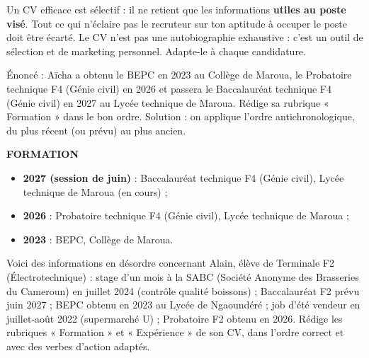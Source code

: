 \documentclass[11pt]{article}
\newcommand{\cle}[1]{{\popxbold\color{popdark}#1}}
\begin{document}
\begin{propriete}
Un CV efficace est \cle{sélectif} : il ne retient que les informations \textbf{utiles au poste visé}. Tout ce qui n'éclaire pas le recruteur sur ton aptitude à occuper le poste doit être écarté. Le CV n'est pas une autobiographie exhaustive : c'est un outil de sélection et de marketing personnel. Adapte-le à chaque candidature.
\end{propriete}

\begin{exoresolu}
Énoncé : Aïcha a obtenu le BEPC en 2023 au Collège de Maroua, le Probatoire technique F4 (Génie civil) en 2026 et passera le Baccalauréat technique F4 (Génie civil) en 2027 au Lycée technique de Maroua. Rédige sa rubrique « Formation » dans le bon ordre.
\tcblower
Solution : on applique l'ordre antichronologique, du plus récent (ou prévu) au plus ancien.\par
\textbf{FORMATION}\par
\begin{itemize}
\item \textbf{2027 (session de juin)} : Baccalauréat technique F4 (Génie civil), Lycée technique de Maroua (en cours) ;
\item \textbf{2026} : Probatoire technique F4 (Génie civil), Lycée technique de Maroua ;
\item \textbf{2023} : BEPC, Collège de Maroua.
\end{itemize}
\end{exoresolu}

\begin{exercice}
Voici des informations en désordre concernant Alain, élève de Terminale F2 (Électrotechnique) : stage d'un mois à la SABC (Société Anonyme des Brasseries du Cameroun) en juillet 2024 (contrôle qualité boissons) ; Baccalauréat F2 prévu juin 2027 ; BEPC obtenu en 2023 au Lycée de Ngaoundéré ; job d'été vendeur en juillet-août 2022 (supermarché U) ; Probatoire F2 obtenu en 2026. Rédige les rubriques « Formation » et « Expérience » de son CV, dans l'ordre correct et avec des verbes d'action adaptés.
\end{exercice}
\end{document}
